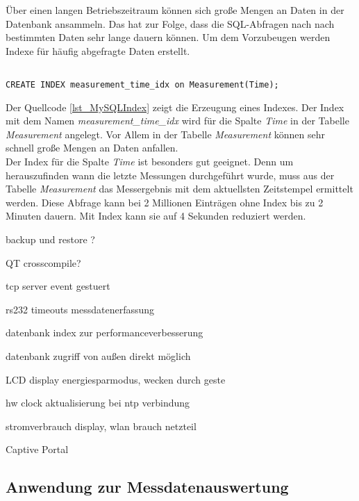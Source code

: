 Über einen langen Betriebszeitraum können sich große Mengen an Daten in der Datenbank ansammeln. Das hat zur Folge, dass die SQL-Abfragen nach nach bestimmten Daten sehr lange dauern können. Um dem Vorzubeugen werden Indexe für häufig abgefragte Daten erstellt.\\

\begin{lstlisting}[caption={MySQL Index},label=lst_MySQLIndex]

CREATE INDEX measurement_time_idx on Measurement(Time);

\end{lstlisting}


Der Quellcode \ref{lst_MySQLIndex} zeigt die Erzeugung eines Indexes. Der Index mit dem Namen \textit{measurement\_time\_idx} wird für die Spalte \textit{Time} in der Tabelle \textit{Measurement} angelegt. Vor Allem in der Tabelle \textit{Measurement} können sehr schnell große Mengen an Daten anfallen.\\
Der Index für die Spalte \textit{Time} ist besonders gut geeignet. Denn um herauszufinden wann die letzte Messungen durchgeführt wurde, muss aus der Tabelle \textit{Measurement} das Messergebnis mit dem aktuellsten Zeitstempel ermittelt werden. Diese Abfrage kann bei 2 Millionen Einträgen ohne Index bis zu  2 Minuten dauern. Mit Index kann sie auf 4 Sekunden reduziert werden.








backup und restore ?

QT crosscompile?

tcp server event gestuert

rs232 timeouts messdatenerfassung

datenbank index zur performanceverbesserung

datenbank zugriff von außen direkt möglich

LCD display energiesparmodus, wecken durch geste


hw clock aktualisierung bei ntp verbindung


stromverbrauch display, wlan brauch netzteil

Captive Portal




\subsection{Anwendung zur Messdatenauswertung}
